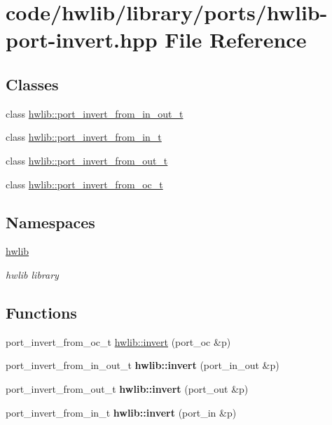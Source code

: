 \hypertarget{hwlib-port-invert_8hpp}{}\section{code/hwlib/library/ports/hwlib-\/port-\/invert.hpp File Reference}
\label{hwlib-port-invert_8hpp}
\subsection*{Classes}
\begin{DoxyCompactItemize}
\item 
class \hyperlink{classhwlib_1_1port__invert__from__in__out__t}{hwlib\+::port\+\_\+invert\+\_\+from\+\_\+in\+\_\+out\+\_\+t}
\item 
class \hyperlink{classhwlib_1_1port__invert__from__in__t}{hwlib\+::port\+\_\+invert\+\_\+from\+\_\+in\+\_\+t}
\item 
class \hyperlink{classhwlib_1_1port__invert__from__out__t}{hwlib\+::port\+\_\+invert\+\_\+from\+\_\+out\+\_\+t}
\item 
class \hyperlink{classhwlib_1_1port__invert__from__oc__t}{hwlib\+::port\+\_\+invert\+\_\+from\+\_\+oc\+\_\+t}
\end{DoxyCompactItemize}
\subsection*{Namespaces}
\begin{DoxyCompactItemize}
\item 
 \hyperlink{namespacehwlib}{hwlib}
\begin{DoxyCompactList}\small\item\em hwlib library \end{DoxyCompactList}\end{DoxyCompactItemize}
\subsection*{Functions}
\textbf{ }\par
\begin{DoxyCompactItemize}
\item 
port\+\_\+invert\+\_\+from\+\_\+oc\+\_\+t \hyperlink{namespacehwlib_a5c1e15f25a48422bbb39fa1aba2c27e9}{hwlib\+::invert} (port\+\_\+oc \&p)
\item 
\mbox{\label{namespacehwlib_aba7a64c2cf66dd80210df6e99f6a6277}} 
port\+\_\+invert\+\_\+from\+\_\+in\+\_\+out\+\_\+t {\bfseries hwlib\+::invert} (port\+\_\+in\+\_\+out \&p)
\item 
\mbox{\label{namespacehwlib_a8a434f5c722817e6e22fb311fe1d8916}} 
port\+\_\+invert\+\_\+from\+\_\+out\+\_\+t {\bfseries hwlib\+::invert} (port\+\_\+out \&p)
\item 
\mbox{\label{namespacehwlib_a362d1218a89beb2caa746fec5016aa8b}} 
port\+\_\+invert\+\_\+from\+\_\+in\+\_\+t {\bfseries hwlib\+::invert} (port\+\_\+in \&p)
\end{DoxyCompactItemize}

